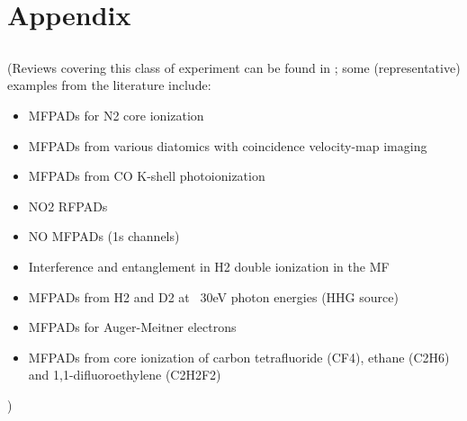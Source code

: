 \section{Appendix}

\subsection{}

(Reviews covering this class of experiment can be found in  \cite{Yagishita2005,Reid2012,dowek2012PhotoionizationDynamicsPhotoemission,Yagishita2015}; some (representative) examples from the literature include:
\begin{itemize}
\item MFPADs for N2 core ionization \cite{Shigemasa1995}
\item MFPADs from various diatomics with coincidence velocity-map imaging \cite{Eland2000} \cite{Hikosaka2000}
\item MFPADs from CO K-shell photoionization \cite{motoki2000KshellPhotoionizationCO}
\item NO2 RFPADs \cite{Toffoli2007}
\item NO MFPADs (1s channels) \cite{Li2007}
\item Interference and entanglement in H2 double ionization in the MF \cite{Akoury2007}
\item MFPADs from H2 and D2 at ~30eV photon energies (HHG source) \cite{Billaud2012a}
\item MFPADs for Auger-Meitner electrons \cite{Cryan2010,Cryan2012a}
\item MFPADs from core ionization of carbon tetrafluoride (CF4), ethane (C2H6) and 1,1-difluoroethylene (C2H2F2)\cite{Menssen2016}
\end{itemize}

)